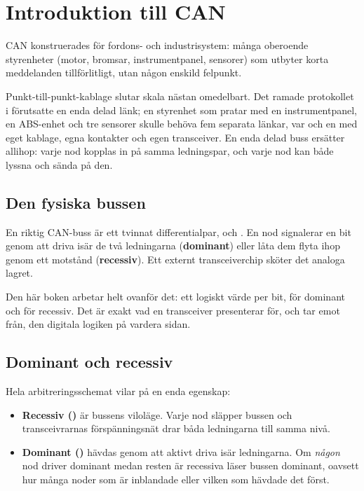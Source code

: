 
\section{Introduktion till CAN}
\label{c10:sec:can}

CAN konstruerades för fordons- och industrisystem: många oberoende styrenheter (motor, bromsar,
instrumentpanel, sensorer) som utbyter korta meddelanden tillförlitligt, utan någon enskild
felpunkt.

Punkt-till-punkt-kablage slutar skala nästan omedelbart. Det ramade protokollet i
 förutsatte en enda delad länk; en styrenhet som pratar med en
instrumentpanel, en ABS-enhet och tre sensorer skulle behöva fem separata länkar, var och en med
eget kablage, egna kontakter och egen transceiver. En enda delad buss ersätter allihop: varje nod
kopplas in på samma ledningspar, och varje nod kan både lyssna och sända på den.

\subsection*{Den fysiska bussen}
En riktig CAN-buss är ett tvinnat differentialpar,  och . En nod signalerar
en bit genom att driva isär de två ledningarna (\textbf{dominant}) eller låta dem flyta ihop genom
ett motstånd (\textbf{recessiv}). Ett externt transceiverchip sköter det analoga lagret.

Den här boken arbetar helt ovanför det: ett logiskt värde per bit,  för dominant och
 för recessiv. Det är exakt vad en transceiver presenterar för, och tar emot från, den
digitala logiken på vardera sidan.

\subsection*{Dominant och recessiv}
Hela arbitreringsschemat vilar på en enda egenskap:
\begin{itemize}
  \item \textbf{Recessiv ()} är bussens viloläge. Varje nod släpper bussen och
    transceivrarnas förspänningsnät drar båda ledningarna till samma nivå.
  \item \textbf{Dominant ()} hävdas genom att aktivt driva isär ledningarna. Om \emph{någon}
    nod driver dominant medan resten är recessiva läser bussen dominant, oavsett hur många noder som
    är inblandade eller vilken som hävdade det först.
\end{itemize}

